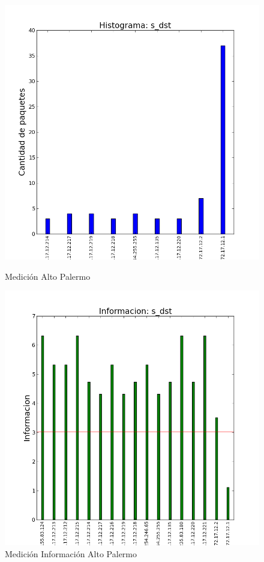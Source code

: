 \begin{figure}[H]
   \begin{minipage}{0.5\linewidth}
     \includegraphics[width=\linewidth]{../imgs/snifAlto-ips_s_dst_hist.png}
     \caption{Medición Alto Palermo}\label{fig:Alto-dst-hist}
   \end{minipage}
  \hfill
   \begin{minipage}{0.5\linewidth}
     \includegraphics[width=\linewidth]{../imgs/snifAlto-ips_s_dst_info.png}
     \caption{Medición Información Alto Palermo}\label{fig:Alto-dst-info}
   \end{minipage}
 \end{figure}

